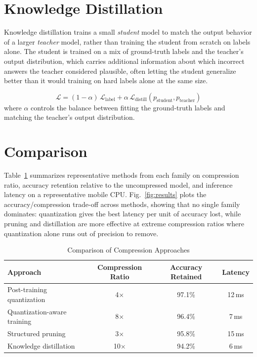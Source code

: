 \documentclass[11pt]{article}
\begin{document}
\section{Knowledge Distillation}
\label{sec:distillation}
Knowledge distillation trains a small \emph{student} model to match the output behavior of a larger \emph{teacher} model, rather than training the student from scratch on labels alone. The student is trained on a mix of ground-truth labels and the teacher's output distribution, which carries additional information about which incorrect answers the teacher considered plausible, often letting the student generalize better than it would training on hard labels alone at the same size.

\begin{equation}
\mathcal{L} = (1-\alpha)\,\mathcal{L}_{\text{label}} + \alpha\,\mathcal{L}_{\text{distill}}(p_{\text{student}}, p_{\text{teacher}})
\label{eq:distill}
\end{equation}
where $\alpha$ controls the balance between fitting the ground-truth labels and matching the teacher's output distribution.

\section{Comparison}
Table~\ref{tab:results} summarizes representative methods from each family on compression ratio, accuracy retention relative to the uncompressed model, and inference latency on a representative mobile CPU. Fig.~\ref{fig:results} plots the accuracy/compression trade-off across methods, showing that no single family dominates: quantization gives the best latency per unit of accuracy lost, while pruning and distillation are more effective at extreme compression ratios where quantization alone runs out of precision to remove.

\begin{table}[htbp]
\centering
\caption{Comparison of Compression Approaches}
\label{tab:results}
\begin{tabular}{lccc}
\hline
Approach & Compression Ratio & Accuracy Retained & Latency \\
\hline
Post-training quantization & 4$\times$ & 97.1\% & 12\,ms \\
Quantization-aware training & 8$\times$ & 96.4\% & 7\,ms \\
Structured pruning & 3$\times$ & 95.8\% & 15\,ms \\
Knowledge distillation & 10$\times$ & 94.2\% & 6\,ms \\
\hline
\end{tabular}
\end{table}
\end{document}
